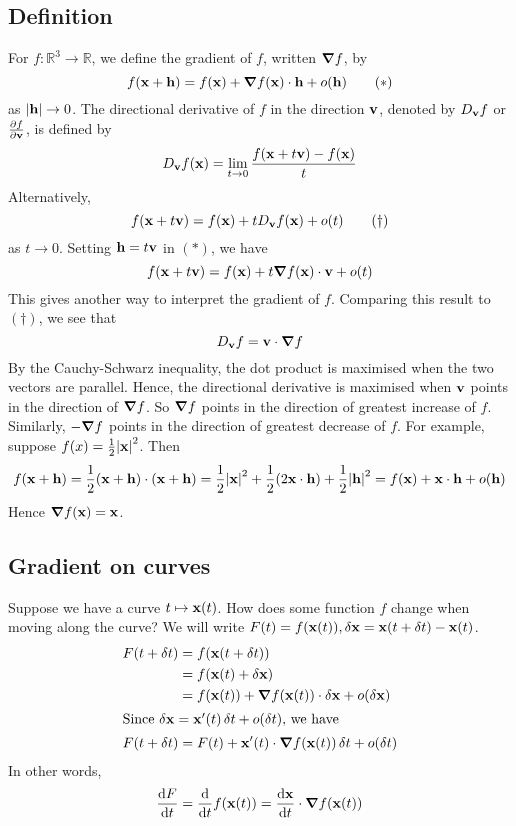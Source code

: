 \subsection{Definition}
For \(f \colon \mathbb R^3 \to \mathbb R\), we define the gradient of \(f\), written \(\grad f\), by
\begin{equation}
	f(\vb x + \vb h) = f(\vb x) + \grad f(\vb x) \cdot \vb h + o(\vb h)
	\tag{\(\ast\)}
\end{equation}
as \(\abs{\vb h} \to 0\).
The directional derivative of \(f\) in the direction \(\vb v\), denoted by \(D_{\vb v} f\) or \(\frac{\partial f}{\partial \vb v}\), is defined by
\[
	D_{\vb v} f(\vb x) = \lim_{t \to 0} \frac{f(\vb x + t\vb v) - f(\vb x)}{t}
\]
Alternatively,
\begin{equation}
	f(\vb x + t\vb v) = f(\vb x) + t D_{\vb v}f(\vb x) + o(t)
	\tag{\(\dagger\)}
\end{equation}
as \(t \to 0\).
Setting \(\vb h = t\vb v\) in \((\ast)\), we have
\[
	f(\vb x + t\vb v) = f(\vb x) + t \grad f(\vb x) \cdot \vb v + o(t)
\]
This gives another way to interpret the gradient of \(f\).
Comparing this result to \((\dagger)\), we see that
\[
	D_{\vb v} f = \vb v \cdot \grad f
\]
By the Cauchy-Schwarz inequality, the dot product is maximised when the two vectors are parallel.
Hence, the directional derivative is maximised when \(\vb v\) points in the direction of \(\grad f\).
So \(\grad f\) points in the direction of greatest increase of \(f\).
Similarly, \(-\grad f\) points in the direction of greatest decrease of \(f\).
For example, suppose \(f(x) = \frac{1}{2}\abs{\vb x}^2\).
Then
\[
	f(\vb x + \vb h) = \frac{1}{2}(\vb x + \vb h)\cdot (\vb x + \vb h) = \frac{1}{2}\abs{\vb x}^2 + \frac{1}{2}(2\vb x \cdot \vb h) + \frac{1}{2}\abs{\vb h}^2 = f(\vb x) + \vb x \cdot \vb h + o(\vb h)
\]
Hence \(\grad f(\vb x) = \vb x\).

\subsection{Gradient on curves}
Suppose we have a curve \(t \mapsto \vb x(t)\).
How does some function \(f\) change when moving along the curve?
We will write \(F(t) = f(\vb x(t)), \delta \vb x = \vb x(t + \delta t) - \vb x(t)\).
\begin{align*}
	F(t + \delta t) & = f(\vb x(t + \delta t))                                               \\
	                & = f(\vb x(t) + \delta \vb x)                                           \\
	                & = f(\vb x(t)) + \grad f(\vb x(t)) \cdot \delta \vb x + o(\delta \vb x) \\
	\intertext{Since \(\delta \vb x = \vb x'(t) \,\delta t + o(\delta t)\), we have}
	F(t + \delta t) & = F(t) + \vb x'(t) \cdot \grad f(\vb x(t)) \,\delta t + o(\delta t)
\end{align*}
In other words,
\[
	\frac{\dd{F}}{\dd{t}} = \frac{\dd}{\dd{t}}f(\vb x(t)) = \frac{\dd \vb x}{\dd{t}} \cdot \grad f(\vb x(t))
\]

